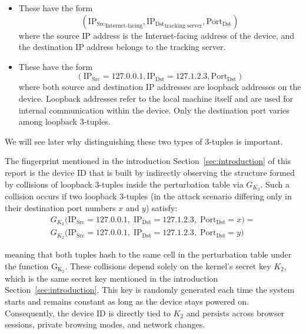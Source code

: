 \documentclass[twocolumn]{report}
\begin{document}
\begin{itemize}
	\item {} These have the form
	\begin{equation*}
		(\mathrm{IP_{Src}}_{\text{Internet-facing}}, \mathrm{IP_{Dst}}_{\text{tracking server}}, \mathrm{Port_{Dst}})
	\end{equation*}
	where the source IP address is the Internet-facing address of the device, and the destination IP address belongs to the tracking server.

	\item {} These have the form
	\begin{equation*}
		(\mathrm{IP_{Src}} = 127.0.0.1, \mathrm{IP_{Dst}} = 127.1.2.3, \mathrm{Port_{Dst}})
	\end{equation*}
	where both source and destination IP addresses are loopback addresses on the device. \alert{Loopback addresses} refer to the local machine itself and are used for internal communication within the device. Only the \alert{destination port} varies among loopback 3-tuples.
\end{itemize}

We will see later why distinguishing these two types of 3-tuples is important.

The fingerprint mentioned in the introduction Section~\ref{sec:introduction} of this report is the \alert{device ID} that is built by indirectly observing the structure formed by \alert{collisions of loopback 3-tuples} inside the perturbation table via $G_{K_2}$. Such a collision occurs if two loopback 3-tuples (in the attack scenario differing only in their destination port numbers $x$ and $y$) satisfy:
\begin{equation*}
	\begin{split}
		G_{K_{2}}\bigl(
		\mathrm{IP}_{\mathrm{Src}} = 127.0.0.1,\;
		\mathrm{IP}_{\mathrm{Dst}} = 127.1.2.3,\;
		\mathrm{Port}_{\mathrm{Dst}} = x
		\bigr)
		= \\
		G_{K_{2}}\bigl(
		\mathrm{IP}_{\mathrm{Src}} = 127.0.0.1,\;
		\mathrm{IP}_{\mathrm{Dst}} = 127.1.2.3,\;
		\mathrm{Port}_{\mathrm{Dst}} = y
		\bigr)
	\end{split}
\end{equation*}
\vspace{-0.5cm}

meaning that both tuples hash to the same cell in the perturbation table under the function $\mathrm{G_{K_2}}$. These collisions depend solely on the kernel’s \alert{secret key} $K_2$, which is the same secret key mentioned in the introduction Section~\ref{sec:introduction}. This key is randomly generated each time the \alert{system starts} and remains constant as long as the device stays powered on. Consequently, the device ID is directly tied to $K_2$ and persists across browser sessions, private browsing modes, and network changes.
\end{document}
